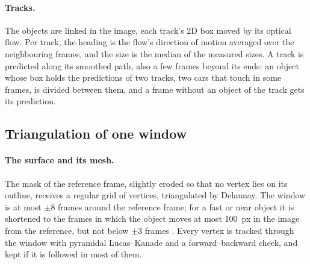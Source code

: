 \documentclass[runningheads,a4paper]{llncs}
\begin{document}
\paragraph{Tracks.} The objects are linked in the image, each track's 2D box moved by its optical flow. Per track, the
heading is the flow's direction of motion averaged over the neighbouring frames, and the size is the median of the
measured sizes. A track is predicted along its smoothed path, also a few frames beyond its ends: an object whose box
holds the predictions of two tracks, two cars that touch in some frames, is divided between them, and a frame without
an object of the track gets its prediction.

\subsection{Triangulation of one window}\label{sec:window}

\paragraph{The surface and its mesh.} The mask of the reference frame, slightly eroded so that no vertex lies on its
outline, receives a regular grid of vertices, triangulated by Delaunay. The window is at most $\pm 8$ frames around the reference frame; for a fast or near object it is shortened to the frames in which the object moves at most 100~px in the image from the reference, but not below $\pm 3$ frames . Every vertex is tracked through the window with pyramidal Lucas--Kanade \cite{lucas_kanade} and a forward--backward check, and kept if it is
followed in most of them.
\end{document}
